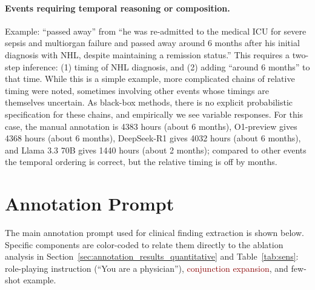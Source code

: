 \documentclass[pmlr,twocolumn,10pt]{jmlr} %
\begin{document}
\paragraph{Events requiring temporal reasoning or composition.}
Example: ``passed away'' from ``he was re-admitted to the medical ICU for severe sepsis and multiorgan failure and passed away around 6 months after his initial diagnosis with NHL, despite maintaining a remission status.''
This requires a two-step inference: (1) timing of NHL diagnosis, and (2) adding ``around 6 months'' to that time.
While this is a simple example, more complicated chains of relative timing were noted, sometimes involving other events whose timings are themselves uncertain.
As black-box methods, there is no explicit probabilistic specification for these chains, and empirically we see variable responses.
For this case, the manual annotation is 4383 hours (about 6 months), O1-preview gives 4368 hours (about 6 months), DeepSeek-R1 gives 4032 hours (about 6 months), and Llama 3.3 70B gives 1440 hours (about 2 months); compared to other events the temporal ordering is correct, but the relative timing is off by months.

\clearpage


\section{Annotation Prompt}\label{apd:prompt}
The main annotation prompt used for clinical finding extraction is shown below. 
Specific components are color-coded to relate them directly to the ablation analysis in Section~\ref{sec:annotation_results_quantitative} and Table~\ref{tab:sens}: \textcolor{darkpurple}{role-playing instruction} (``You are a physician''), \textcolor{darkred}{conjunction expansion}, and \textcolor{darkteal}{few-shot example}.
\end{document}
